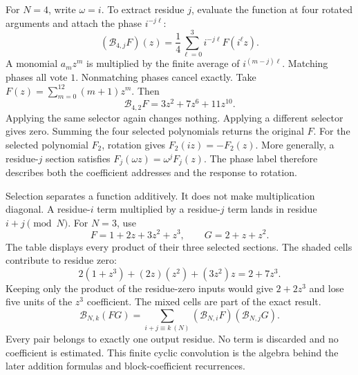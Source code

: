 For $N=4$, write $\omega=i$. To extract residue $j$, evaluate the function at four rotated arguments and attach the phase $i^{-j\ell}$:
\[
(\mathcal B_{4,j}F)(z)=\frac14\sum_{\ell=0}^{3}i^{-j\ell}F(i^\ell z).
\]
A monomial $a_mz^m$ is multiplied by the finite average of $i^{(m-j)\ell}$. Matching phases all vote $1$. Nonmatching phases cancel exactly.
Take $F(z)=\sum_{m=0}^{12}(m+1)z^m$. Then
\[
\mathcal B_{4,2}F=3z^2+7z^6+11z^{10}.
\]
Applying the same selector again changes nothing. Applying a different selector gives zero. Summing the four selected polynomials returns the original $F$.
For the selected polynomial $F_2$, rotation gives $F_2(iz)=-F_2(z)$. More generally, a residue-$j$ section satisfies $F_j(\omega z)=\omega^jF_j(z)$. The phase label therefore describes both the coefficient addresses and the response to rotation.

Selection separates a function additively. It does not make multiplication diagonal. A residue-$i$ term multiplied by a residue-$j$ term lands in residue $i+j\pmod N$.
For $N=3$, use
\[
F=1+2z+3z^2+z^3,\qquad G=2+z+z^2.
\]
The table displays every product of their three selected sections.
The shaded cells contribute to residue zero:
\[
2(1+z^3)+(2z)(z^2)+(3z^2)z=2+7z^3.
\]
Keeping only the product of the residue-zero inputs would give $2+2z^3$ and lose five units of the $z^3$ coefficient. The mixed cells are part of the exact result.
\[
\mathcal B_{N,k}(FG)=
\sum_{i+j\equiv k\ (N)}(\mathcal B_{N,i}F)(\mathcal B_{N,j}G).
\]
Every pair belongs to exactly one output residue. No term is discarded and no coefficient is estimated. This finite cyclic convolution is the algebra behind the later addition formulas and block-coefficient recurrences.

